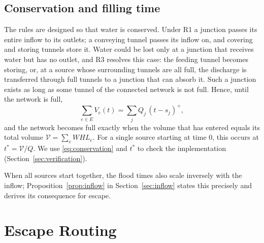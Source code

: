\documentclass[11pt,a4paper]{article}
\theoremstyle{plain}
\theoremstyle{definition}
\theoremstyle{remark}
\begin{document}
\subsection{Conservation and filling time}\label{sec:conservation}
The rules are designed so that water is conserved. Under R1 a junction passes its entire inflow to its outlets; a conveying tunnel passes its inflow on, and covering and storing tunnels store it. Water could be lost only at a junction that receives water but has no outlet, and R3 resolves this case: the feeding tunnel becomes storing, or, at a source whose surrounding tunnels are all full, the discharge is transferred through full tunnels to a junction that can absorb it. Such a junction exists as long as some tunnel of the connected network is not full. Hence, until the network is full,
\begin{equation}
  \sum_{e\in E} V_e(t) = \sum_{j} Q_j\,(t - s_j)^+ ,
  \label{eq:conservation}
\end{equation}
and the network becomes full exactly when the volume that has entered equals its total volume $\mathcal{V} = \sum_{e} W H L_e$. For a single source starting at time $0$, this occurs at $t^* = \mathcal{V}/Q$. We use \eqref{eq:conservation} and $t^*$ to check the implementation (Section~\ref{sec:verification}).

When all sources start together, the flood times also scale inversely with the inflow; Proposition~\ref{prop:inflow} in Section~\ref{sec:inflow} states this precisely and derives its consequence for escape.

\section{Escape Routing}\label{sec:routing}
\end{document}
